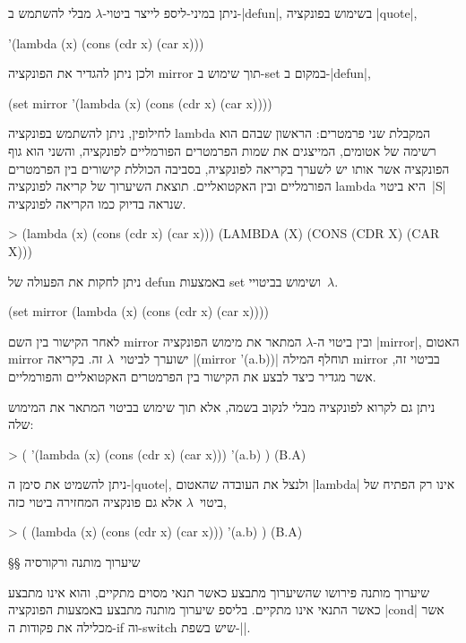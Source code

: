 ניתן במיני-ליספ לייצר ביטוי-$λ$ מבלי להשתמש ב-\E|defun|, בשימוש בפונקציה
\E|quote|,
\begin{LISP}
  '(lambda (x) (cons (cdr x) (car x)))
\end{LISP}
ולכן ניתן להגדיר את הפונקציה mirror תוך שימוש ב-set במקום ב-\E|defun|,
\begin{LISP}
(set mirror
  '(lambda (x) (cons (cdr x) (car x))))
\end{LISP}
לחילופין, ניתן להשתמש בפונקציה lambda המקבלת שני פרמטרים: הראשון שבהם הוא רשימה
של אטומים, המייצגים את שמות הפרמטרים הפורמליים לפונקציה, והשני הוא גוף הפונקציה
אשר אותו יש לשערך בקריאה לפונקציה, בסביבה הכוללת קישורים בין הפרמטרים הפורמליים
ובין האקטואליים. תוצאת השיערוך של קריאה לפונקציה lambda היא ביטוי~\E|S| שנראה
בדיוק כמו הקריאה לפונקציה.
\begin{LISP}
> (lambda (x) (cons (cdr x) (car x)))
(LAMBDA (X) (CONS (CDR X) (CAR X)))
\end{LISP}
ניתן לחקות את הפעולה של defun באמצעות set ושימוש בביטויי~$λ$.
\begin{LISP}
(set mirror
  (lambda (x) (cons (cdr x) (car x))))
\end{LISP}
לאחר הקישור בין השם mirror ובין ביטוי ה-$λ$ המתאר את מימוש הפונקציה \E|mirror|,
האטום mirror ישוערך לביטוי~$λ$ זה. בקריאה \T|(mirror '(a.b))| תוחלף המילה
mirror בביטוי זה, אשר מגדיר כיצד לבצע את הקישור בין הפרמטרים האקטואליים
והפורמליים.

ניתן גם לקרוא לפונקציה מבלי לנקוב בשמה, אלא תוך שימוש בביטוי המתאר את המימוש
שלה:
\pagebreak[3]
\begin{LISP}
> (
    '(lambda (x)
      (cons (cdr x) (car x)))
    '(a.b)
)
(B.A)
\end{LISP}
ניתן להשמיט את סימן ה-\E|quote|, ולנצל את העובדה שהאטום \T|lambda| אינו רק
הפתיח של ביטוי~$λ$ אלא גם פונקציה המחזירה ביטוי כזה,
\begin{LISP}
> (
    (lambda (x) (cons (cdr x) (car x)))
    '(a.b)
)
(B.A)
\end{LISP}

§§ שיערוך מותנה ורקורסיה

שיערוך מותנה פירושו שהשיערוך מתבצע כאשר תנאי מסוים מתקיים, והוא אינו מתבצע
כאשר התנאי אינו מתקיים. בליספ שיערוך מותנה מתבצע באמצעות הפונקציה \E|cond|
אשר מכלילה את פקודות ה-if וה-switch שיש בשפת-\E|\CPL|.

